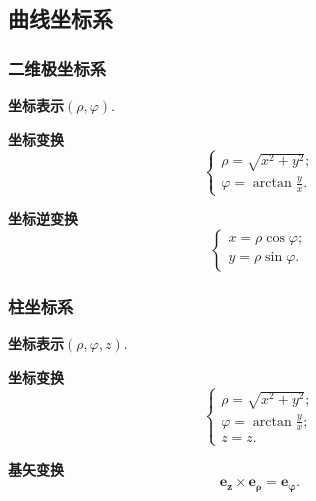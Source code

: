 \subsection{曲线坐标系}
\subsubsection{二维极坐标系}
\textbf{坐标表示}\quad $(\rho, \varphi)$.

\textbf{坐标变换}
\begin{equation}
    \begin{cases}
        \rho=\sqrt{x^2+y^2}; \\
        \varphi=\arctan\frac{y}{x}.
    \end{cases}
\end{equation}

\textbf{坐标逆变换}
\begin{equation}
    \begin{cases}
        x=\rho\cos\varphi; \\
        y=\rho\sin\varphi.
    \end{cases}
\end{equation}

\subsubsection{柱坐标系}
\textbf{坐标表示}\quad $(\rho, \varphi, z)$.

\textbf{坐标变换}
\begin{equation}
    \begin{cases}
        \rho=\sqrt{x^2+y^2};        \\
        \varphi=\arctan\frac{y}{x}; \\
        z=z.
    \end{cases}
\end{equation}

\textbf{基矢变换}
\begin{equation}
    \bm{e_z}\times\bm{e_\rho}=\bm{e_\varphi}.
\end{equation}

